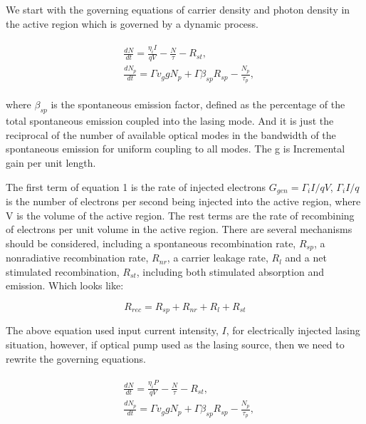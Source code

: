 We start with the governing equations of carrier density and photon density in
the active region which is governed by a dynamic process.

\begin{eqnarray}
\begin{aligned}
  & \frac{dN}{dt} = \frac{\eta_{i}I}{qV} - \frac{N}{\tau} - R_{st},
  \\
  & \frac{dN_p}{dt} = {\Gamma}v_g{g}N_p + \Gamma\beta_{sp}R_{sp} - \frac{N_p}{\tau_p},
\end{aligned}
\label{eq:eight}
\end{eqnarray}

where $\beta_{sp}$ is the spontaneous emission factor, defined as the
percentage of the total spontaneous emission coupled into the lasing mode. And it is
just the reciprocal of the number of available optical modes in the bandwidth of
the spontaneous emission for uniform coupling to all modes. The g is Incremental gain
per unit length.

The first term of equation 1 is the rate of injected electrons $G_{gen} =
{\Gamma_{i}I}/{qV}$, ${\Gamma_{i}I}/{q}$ is the number of electrons per
second being injected into the active region, where V is the volume of the
active region. The rest terms are the rate of recombining of electrons per unit
volume in the active region. There are several mechanisms should be considered,
including a spontaneous recombination rate, $R_{sp}$, a nonradiative
recombination rate, $R_{nr}$, a carrier leakage rate, $R_l$ and a net
stimulated recombination, $R_{st}$, including both stimulated absorption and
emission. Which looks like:

\begin{equation}
  R_{rec} = R_{sp} + R_{nr} + R_{l} + R_{st}
\end{equation}

The above equation used input current intensity, $I$, for electrically injected
lasing situation, however, if optical pump used as the lasing source, then we
need to rewrite the governing equations.

\begin{eqnarray}
\begin{aligned}
  & \frac{dN}{dt} = \frac{\eta_{i}P}{qV} - \frac{N}{\tau} - R_{st},
  \\
  & \frac{dN_p}{dt} = {\Gamma}v_g{g}N_p + \Gamma\beta_{sp}R_{sp} - \frac{N_p}{\tau_p},
\end{aligned}
\label{eq:eight}
\end{eqnarray}

